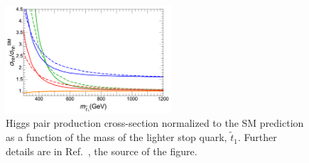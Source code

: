 \begin{figure}[!htb]
    \begin{center}
        \includegraphics[width=0.55\textwidth]{figures/higgs_corr/sigma_hh_stops}
        \caption{
            Higgs pair production cross-section normalized to the SM prediction as a function
            of the mass of the lighter stop quark, $\tilde{t}_1$.
            Further details are in Ref.~\cite{LightStopsHiggs}, the source of the figure.
        }
        \label{fig:hh_sigma_stops}
    \end{center}
\end{figure}
